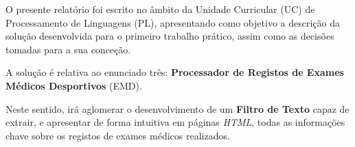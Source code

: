 O presente relatório foi escrito no âmbito da Unidade Curricular (UC) de Processamento de Linguagens (PL), apresentando 
como objetivo a descrição da solução desenvolvida para o primeiro trabalho prático, assim como as decisões 
tomadas para a sua conceção.

A solução é relativa ao enunciado três: \textbf{Processador de Registos de Exames Médicos Desportivos} (EMD).

Neste sentido, irá aglomerar o desenvolvimento de um \textbf{Filtro de Texto} capaz de extrair, e apresentar de forma intuitiva
em páginas \textit{HTML}, todas as informações chave sobre os registos de exames médicos realizados.